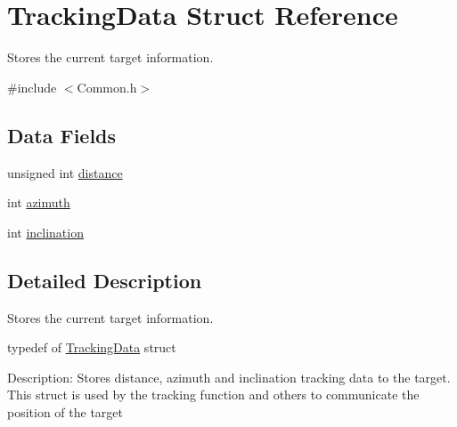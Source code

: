\hypertarget{structTrackingData}{\section{Tracking\+Data Struct Reference}
\label{structTrackingData}
}


Stores the current target information.  




{\ttfamily \#include $<$Common.\+h$>$}

\subsection*{Data Fields}
\begin{DoxyCompactItemize}
\item 
unsigned int \hyperlink{structTrackingData_a4bb47863775a37236bda65273c01b275}{distance}
\item 
int \hyperlink{structTrackingData_a866e78e12cb32dcaf1ded89bda8be8f5}{azimuth}
\item 
int \hyperlink{structTrackingData_af308b9934394c8bcf7614eb1df2d863f}{inclination}
\end{DoxyCompactItemize}


\subsection{Detailed Description}
Stores the current target information. 



 typedef of \hyperlink{structTrackingData}{Tracking\+Data} struct

Description\+: Stores distance, azimuth and inclination tracking data to the target. This struct is used by the tracking function and others to communicate the position of the target 

